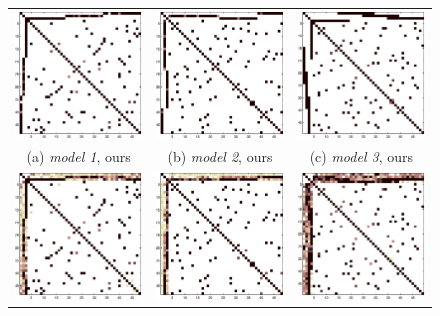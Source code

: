 \begin{figure}
\label{fig:synth}
\center
\begin{tabular}{ccc}
  \includegraphics[width=3.5cm]{fig/disjoint_om} 
  &   \includegraphics[width=3.5cm]{fig/diff_om}
  &   \includegraphics[width=3.5cm]{fig/overlap_om}
   \\    (a) \textit{model 1}, ours & (b)  \textit{model 2}, ours  & (c)  \textit{model 3}, ours  \\[6pt]
 \includegraphics[width=3.5cm]{fig/disjoint_tr} 
  &   \includegraphics[width=3.5cm]{fig/diff_tr}
  &   \includegraphics[width=3.5cm]{fig/overlap_tr}

\end{tabular}
\end{figure}
